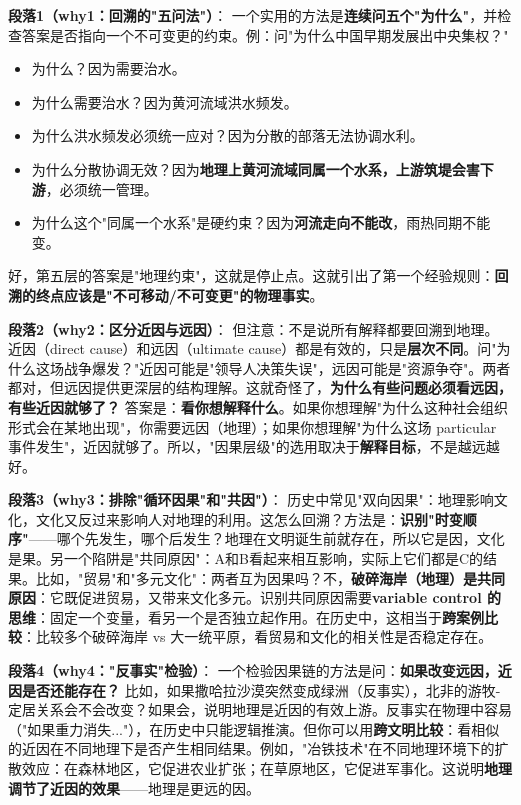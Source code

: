 \documentclass[../main.tex]{subfiles}
\begin{document}
	\textbf{段落1（why1：回溯的"五问法"）}：  
	一个实用的方法是\textbf{连续问五个"为什么"}，并检查答案是否指向一个不可变更的约束。例：问"为什么中国早期发展出中央集权？"  
	\begin{itemize}
	  \item 为什么？因为需要治水。  
	  \item 为什么需要治水？因为黄河流域洪水频发。  
	  \item 为什么洪水频发必须统一应对？因为分散的部落无法协调水利。  
	  \item 为什么分散协调无效？因为\textbf{地理上黄河流域同属一个水系，上游筑堤会害下游}，必须统一管理。  
	  \item 为什么这个"同属一个水系"是硬约束？因为\textbf{河流走向不能改}，雨热同期不能变。  
	\end{itemize}
	好，第五层的答案是"地理约束"，这就是停止点。这就引出了第一个经验规则：\textbf{回溯的终点应该是"不可移动/不可变更"的物理事实}。
	
	\textbf{段落2（why2：区分近因与远因）}：  
	但注意：不是说所有解释都要回溯到地理。近因（direct cause）和远因（ultimate cause）都是有效的，只是\textbf{层次不同}。问"为什么这场战争爆发？"近因可能是"领导人决策失误"，远因可能是"资源争夺"。两者都对，但远因提供更深层的结构理解。这就奇怪了，\textbf{为什么有些问题必须看远因，有些近因就够了？} 答案是：\textbf{看你想解释什么}。如果你想理解"为什么这种社会组织形式会在某地出现"，你需要远因（地理）；如果你想理解"为什么这场 particular 事件发生"，近因就够了。所以，"因果层级"的选用取决于\textbf{解释目标}，不是越远越好。
	
	\textbf{段落3（why3：排除"循环因果"和"共因"）}：  
	历史中常见"双向因果"：地理影响文化，文化又反过来影响人对地理的利用。这怎么回溯？方法是：\textbf{识别"时变顺序"}——哪个先发生，哪个后发生？地理在文明诞生前就存在，所以它是因，文化是果。另一个陷阱是"共同原因"：A和B看起来相互影响，实际上它们都是C的结果。比如，"贸易"和"多元文化"：两者互为因果吗？不，\textbf{破碎海岸（地理）是共同原因}：它既促进贸易，又带来文化多元。识别共同原因需要\textbf{variable control 的思维}：固定一个变量，看另一个是否独立起作用。在历史中，这相当于\textbf{跨案例比较}：比较多个破碎海岸 vs 大一统平原，看贸易和文化的相关性是否稳定存在。
	
	\textbf{段落4（why4："反事实"检验）}：  
	一个检验因果链的方法是问：\textbf{如果改变远因，近因是否还能存在？} 比如，如果撒哈拉沙漠突然变成绿洲（反事实），北非的游牧-定居关系会不会改变？如果会，说明地理是近因的有效上游。反事实在物理中容易（"如果重力消失..."），在历史中只能逻辑推演。但你可以用\textbf{跨文明比较}：看相似的近因在不同地理下是否产生相同结果。例如，"冶铁技术"在不同地理环境下的扩散效应：在森林地区，它促进农业扩张；在草原地区，它促进军事化。这说明\textbf{地理调节了近因的效果}——地理是更远的因。
	
\end{document}

